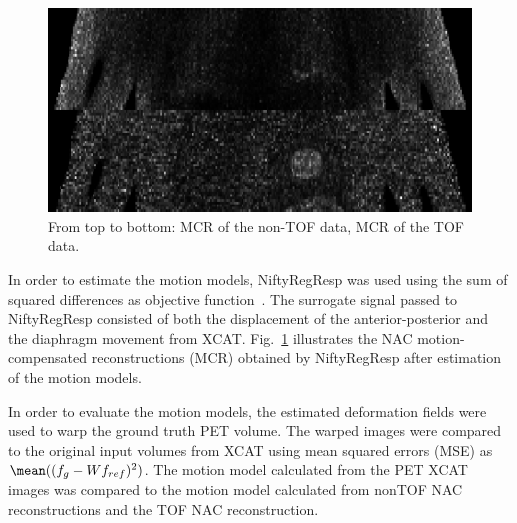 \documentclass[journal]{IEEEtran}
\begin{document}
\begin{figure}
    \centering
    \includegraphics[scale=0.4]{figures/mcr.png}
    \caption{From top to bottom: MCR of the non-TOF data, MCR of the TOF data.}
    \label{fig:mcr}
\end{figure}

In order to estimate the motion models, NiftyRegResp was used using the sum of squared differences as objective function~\cite{NiftyRegResp}. The surrogate signal passed to NiftyRegResp consisted of both the displacement of the anterior-posterior and the  diaphragm movement from XCAT. Fig.~\ref{fig:mcr} illustrates the NAC motion-compensated reconstructions (MCR) obtained by NiftyRegResp after estimation of the motion models.

In order to evaluate the motion models, the estimated deformation fields were used to warp the ground truth PET volume. The warped images were compared to the original input volumes from XCAT using mean squared errors (MSE) as $\mean((f_g-Wf_{ref})^2)$. The motion model calculated from the PET XCAT images was compared to the motion model calculated from nonTOF NAC reconstructions and the TOF NAC reconstruction.  

\end{document}
